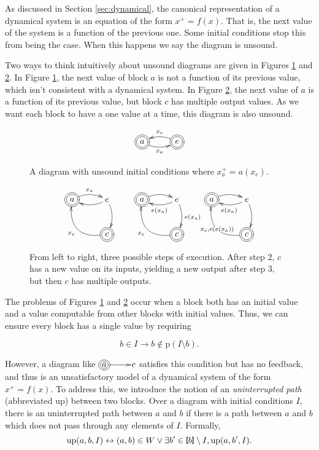 \documentclass[twocolumn]{article}
\newcommand{\TightBracketB}[1]{\raisebox{0.25ex}{\scalebox{0.8}{\boldmath${#1\kern-0.65ex#1}$}}}%
\newcommand*{\Inputs}[1]{\TightBracketB[#1\TightBracketB]}
\begin{document}
As discussed in Section \ref{sec:dynamical}, the canonical representation of a dynamical system is an equation of the form $x^+=f(x)$. That is, the next value of the system is a function of the previous one. Some initial conditions stop this from being the case. When this happens we say the diagram is unsound.

Two ways to think intuitively about unsound diagrams are given in Figures \ref{fig:dynamicalexample} and \ref{fig:multi-value-soundness}. In Figure \ref{fig:dynamicalexample}, the next value of block $a$ is not a function of its previous value, which isn't consistent with a dynamical system. In Figure \ref{fig:multi-value-soundness}, the next value of $a$ is a function of its previous value, but block $c$ has multiple output values. As we want each block to have a one value at a time, this diagram is also unsound.

\begin{figure}[h]
\[
\xymatrix{
    *++[o][F=]{a} \ar@/_/[r]_{x_a} & *++[o][F=]{e} \ar@/_/[l]_{x_e}
}
\]
    \caption{A diagram with unsound initial conditions where $x_a^+=a(x_e)$.}
    \label{fig:dynamicalexample}
\end{figure}

\begin{figure}
\[
\xymatrix{
*++[o][F=]{a} \ar@/^/[r]^{x_a} & e \ar@/^/[l] \ar@/^/[d] & *++[o][F=]{a} \ar@/^/[r] & e \ar@/^/[l]^{e(x_a)} \ar@/^/[d]^{e(x_a)} & *++[o][F=]{a} \ar@/^/[r] & e \ar@/^/[l]^{e(x_a)} \ar@/^/[d] \\
  & *++[o][F=]{c} \ar@/^2em/[lu]^{x_c} && *++[o][F=]{c} \ar@/^2em/[lu]^{x_c} && *++[o][F=]{c} \ar@/^2em/[lu]|{x_c,c(e(x_a))}
}
\]
    \caption{From left to right, three possible steps of execution. After step 2, $c$ has a new value on its inputs, yielding a new output after step 3, but then $c$ has multiple outputs.}
    \label{fig:multi-value-soundness}
\end{figure}

The problems of Figures \ref{fig:dynamicalexample} and \ref{fig:multi-value-soundness} occur when a block both has an initial value and a value computable from other blocks with initial values. Thus, we can ensure every block has a single value by requiring

\[
b\in I\rightarrow b\not\in\text{p}(I\setminus b).
\]

However, a diagram like $\xymatrix@1{*++++[o][F=]{a} \ar[r] & c}$ satisfies this condition but has no feedback, and thus is an unsatisfactory model of a dynamical system of the form $x^+=f(x)$. To address this, we introduce the notion of an \textit{uninterrupted path} (abbreviated $\text{up}$) between two blocks. Over a diagram with initial conditions $I$, there is an uninterrupted path between $a$ and $b$ if there is a path between $a$ and $b$ which does not pass through any elements of $I$. Formally,
\[
    \text{up}(a,b,I) \leftrightarrow (a, b)\in W \lor \exists b'\in \Inputs{b}\setminus I, \text{up}(a,b',I).
\]
\end{document}
